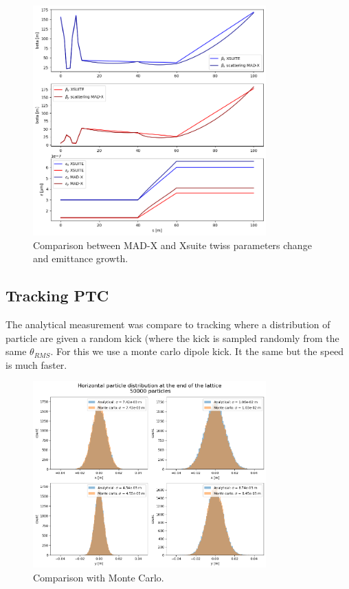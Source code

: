 \documentclass{cernatsnote}
\begin{document}
\begin{figure}[!htb]
\centering
\includegraphics[width=0.8\textwidth]{images/twiss_param_comparison_with_xsuite.png}
\caption{Comparison between MAD-X and Xsuite twiss parameters change and emittance growth.}
\label{fig:twiss_param_comparison_with_xsuite}
\end{figure}

\newpage
\subsection{Tracking PTC}

The analytical measurement was compare to tracking where a distribution of particle are given a random kick (where the kick is sampled randomly from the same $\theta_{RMS}$. For this we use a monte carlo dipole kick. It the same but the speed is much faster.

\begin{figure}[!htb]
\centering
\includegraphics[width=0.8\textwidth]{images/comparison_with_monte_carlo.png}
\caption{Comparison with Monte Carlo.}
\label{fig:comparison_with_monte_carlo}
\end{figure}
\end{document}
